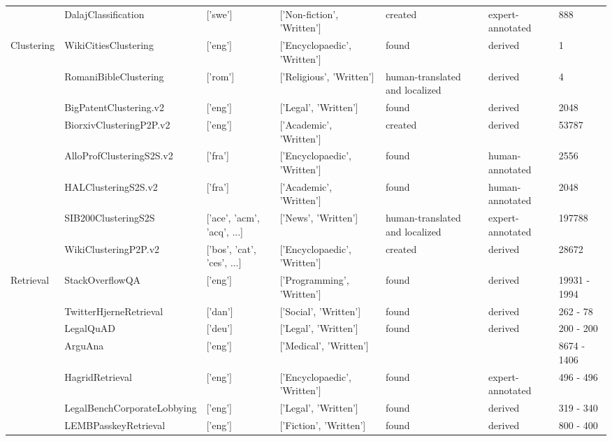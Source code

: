 \begin{table*}
{\begin{tabular}{lllllll}
     & DalajClassification \cite{2105.06681} & ['swe'] & ['Non-fiction', 'Written'] & created & expert-annotated & 888 \\
    \cline{1-7}
    \multirow[t]{8}{*}{Clustering} & WikiCitiesClustering \cite{wikidump} & ['eng'] & ['Encyclopaedic', 'Written'] & found & derived & 1 \\
     & RomaniBibleClustering  & ['rom'] & ['Religious', 'Written'] & human-translated and localized & derived & 4 \\
     & BigPatentClustering.v2 \cite{DBLP:journals/corr/abs-1906-03741} & ['eng'] & ['Legal', 'Written'] & found & derived & 2048 \\
     & BiorxivClusteringP2P.v2  & ['eng'] & ['Academic', 'Written'] & created & derived & 53787 \\
     & AlloProfClusteringS2S.v2 \cite{lef23} & ['fra'] & ['Encyclopaedic', 'Written'] & found & human-annotated & 2556 \\
     & HALClusteringS2S.v2 \cite{ciancone2024extending} & ['fra'] & ['Academic', 'Written'] & found & human-annotated & 2048 \\
     & SIB200ClusteringS2S \cite{adelani2023sib} & ['ace', 'acm', 'acq', ...] & ['News', 'Written'] & human-translated and localized & expert-annotated & 197788 \\
     & WikiClusteringP2P.v2  & ['bos', 'cat', 'ces', ...] & ['Encyclopaedic', 'Written'] & created & derived & 28672 \\
    \cline{1-7}
    \multirow[t]{15}{*}{Retrieval} & StackOverflowQA \cite{li2024coircomprehensivebenchmarkcode} & ['eng'] & ['Programming', 'Written'] & found & derived & 19931 - 1994 \\
     & TwitterHjerneRetrieval \cite{holm2024gllms} & ['dan'] & ['Social', 'Written'] & found & derived & 262 - 78 \\
     & LegalQuAD \cite{9723721} & ['deu'] & ['Legal', 'Written'] & found & derived & 200 - 200 \\
     & ArguAna \cite{boteva2016} & ['eng'] & ['Medical', 'Written'] & & & 8674 - 1406 \\
     & HagridRetrieval \cite{hagrid} & ['eng'] & ['Encyclopaedic', 'Written'] & found & expert-annotated & 496 - 496 \\
     & LegalBenchCorporateLobbying \cite{guha2023legalbench} & ['eng'] & ['Legal', 'Written'] & found & derived & 319 - 340 \\
     & LEMBPasskeyRetrieval \cite{zhu2024longembed} & ['eng'] & ['Fiction', 'Written'] & found & derived & 800 - 400 \\

\end{tabular}}
\end{table*}
